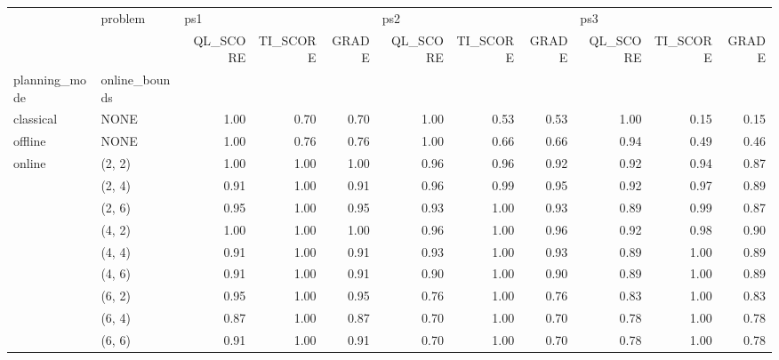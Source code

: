 \begin{tabular}{llrrrrrrrrr}
\toprule
       & problem & \multicolumn{3}{l}{ps1} & \multicolumn{3}{l}{ps2} & \multicolumn{3}{l}{ps3} \\
       & {} & QL\_SCORE & TI\_SCORE & GRADE & QL\_SCORE & TI\_SCORE & GRADE & QL\_SCORE & TI\_SCORE & GRADE \\
planning\_mode & online\_bounds &          &          &       &          &          &       &          &          &       \\
\midrule
classical & NONE &     1.00 &     0.70 &  0.70 &     1.00 &     0.53 &  0.53 &     1.00 &     0.15 &  0.15 \\
offline & NONE &     1.00 &     0.76 &  0.76 &     1.00 &     0.66 &  0.66 &     0.94 &     0.49 &  0.46 \\
online & (2, 2) &     1.00 &     1.00 &  1.00 &     0.96 &     0.96 &  0.92 &     0.92 &     0.94 &  0.87 \\
       & (2, 4) &     0.91 &     1.00 &  0.91 &     0.96 &     0.99 &  0.95 &     0.92 &     0.97 &  0.89 \\
       & (2, 6) &     0.95 &     1.00 &  0.95 &     0.93 &     1.00 &  0.93 &     0.89 &     0.99 &  0.87 \\
       & (4, 2) &     1.00 &     1.00 &  1.00 &     0.96 &     1.00 &  0.96 &     0.92 &     0.98 &  0.90 \\
       & (4, 4) &     0.91 &     1.00 &  0.91 &     0.93 &     1.00 &  0.93 &     0.89 &     1.00 &  0.89 \\
       & (4, 6) &     0.91 &     1.00 &  0.91 &     0.90 &     1.00 &  0.90 &     0.89 &     1.00 &  0.89 \\
       & (6, 2) &     0.95 &     1.00 &  0.95 &     0.76 &     1.00 &  0.76 &     0.83 &     1.00 &  0.83 \\
       & (6, 4) &     0.87 &     1.00 &  0.87 &     0.70 &     1.00 &  0.70 &     0.78 &     1.00 &  0.78 \\
       & (6, 6) &     0.91 &     1.00 &  0.91 &     0.70 &     1.00 &  0.70 &     0.78 &     1.00 &  0.78 \\
\bottomrule
\end{tabular}
